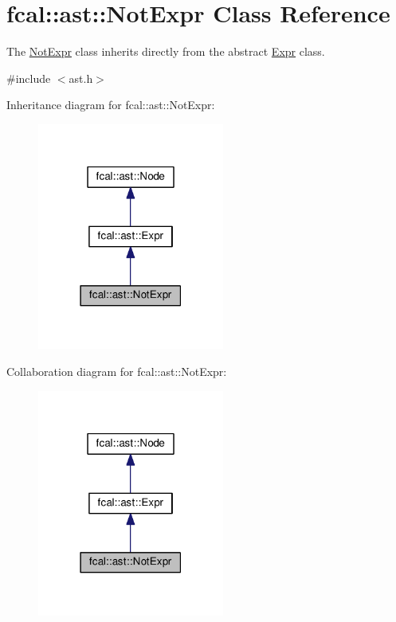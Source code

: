 \hypertarget{classfcal_1_1ast_1_1NotExpr}{}\section{fcal\+:\+:ast\+:\+:Not\+Expr Class Reference}
\label{classfcal_1_1ast_1_1NotExpr}


The \hyperlink{classfcal_1_1ast_1_1NotExpr}{Not\+Expr} class inherits directly from the abstract \hyperlink{classfcal_1_1ast_1_1Expr}{Expr} class.  




{\ttfamily \#include $<$ast.\+h$>$}



Inheritance diagram for fcal\+:\+:ast\+:\+:Not\+Expr\+:\nopagebreak
\begin{figure}[H]
\begin{center}
\leavevmode
\includegraphics[width=174pt]{classfcal_1_1ast_1_1NotExpr__inherit__graph}
\end{center}
\end{figure}


Collaboration diagram for fcal\+:\+:ast\+:\+:Not\+Expr\+:\nopagebreak
\begin{figure}[H]
\begin{center}
\leavevmode
\includegraphics[width=174pt]{classfcal_1_1ast_1_1NotExpr__coll__graph}
\end{center}
\end{figure}
